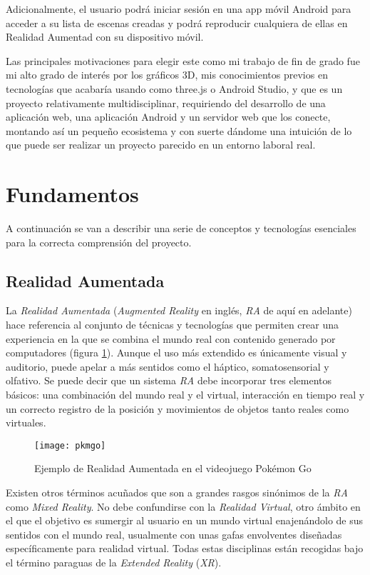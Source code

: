 Adicionalmente, el usuario podrá iniciar sesión en una app móvil Android para acceder a su lista de escenas creadas y podrá reproducir cualquiera de ellas en Realidad Aumentad con su dispositivo móvil.

Las principales motivaciones para elegir este como mi trabajo de fin de grado fue mi alto grado de interés por los gráficos 3D, mis conocimientos previos en tecnologías que acabaría usando como three.js o Android Studio, y que es un proyecto relativamente multidisciplinar, requiriendo del desarrollo de una aplicación web, una aplicación Android y un servidor web que los conecte, montando así un pequeño ecosistema y con suerte dándome una intuición de lo que puede ser realizar un proyecto parecido en un entorno laboral real.

\section{Fundamentos}

A continuación se van a describir una serie de conceptos y tecnologías esenciales para la correcta comprensión del proyecto.

\subsection{Realidad Aumentada}

La \textit{Realidad Aumentada} (\textit{Augmented Reality} en inglés, \textit{RA} de aquí en adelante) hace referencia al conjunto de técnicas y tecnologías que permiten crear una experiencia en la que se combina el mundo real con contenido generado por computadores (figura \ref{fig:pkmgo}). Aunque el uso más extendido es únicamente visual y auditorio, puede apelar a más sentidos como el háptico, somatosensorial y olfativo. Se puede decir que un sistema \textit{RA} debe incorporar tres elementos básicos: una combinación del mundo real y el virtual, interacción en tiempo real y un correcto registro de la posición y movimientos de objetos tanto reales como virtuales. 

\begin{figure}[h]
    \centering
    \texttt{[image: pkmgo]}
    \caption[Ejemplo de Realidad Aumentada]{Ejemplo de Realidad Aumentada en el videojuego Pokémon Go}
    \label{fig:pkmgo}
\end{figure}

Existen otros términos acuñados que son a grandes rasgos sinónimos de la \textit{RA} como \textit{Mixed Reality}. No debe confundirse con la \textit{Realidad Virtual}, otro ámbito en el que el objetivo es sumergir al usuario en un mundo virtual enajenándolo de sus sentidos con el mundo real, usualmente con unas gafas envolventes diseñadas específicamente para realidad virtual. Todas estas disciplinas están recogidas bajo el término paraguas de la \textit{Extended Reality} (\textit{XR}).

